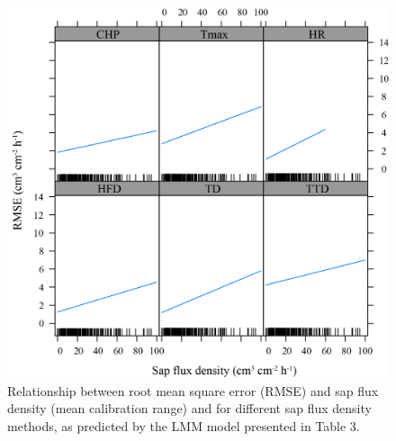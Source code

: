 \documentclass[11pt,twoside]{reedthesis}
\begin{document}
\setlength{\abovecaptionskip}{15pt}
\begin{figure}[hbt!]

{\centering \includegraphics[width=1\linewidth]{figure/appendixA1/fig2} 

}

\caption[Relationship between root mean square error (RMSE) and sap flux density.]{Relationship between root mean square error (RMSE) and sap flux density (mean calibration range) and for different sap flux density methods, as predicted by the LMM model presented in Table 3.}\label{fig:apa122}
\end{figure}
\setlength{\abovecaptionskip}{0pt}
\end{document}

